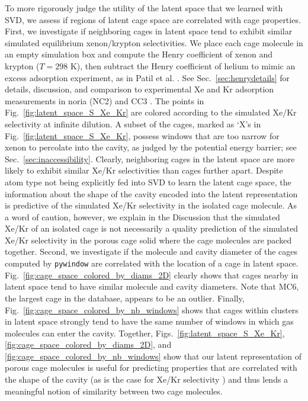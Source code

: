 \documentclass[journal=jacsat,manuscript=article,layout=traditional]{achemso}
\begin{document}
To more rigorously judge the utility of the latent space that we learned with SVD, we assess if regions of latent cage space are correlated with cage properties. First, we investigate if neighboring cages in latent space tend to exhibit similar simulated equilibrium xenon/krypton selectivities.
We place each cage molecule in an empty simulation box and compute the Henry coefficient of xenon and krypton ($T=298$ K), then subtract the Henry coefficient of helium to mimic an excess adsorption experiment, as in Patil et al. \cite{patil2016noria}. See Sec.~\ref{sec:henrydetails} for details, discussion, and comparison to experimental Xe and Kr adsorption measurements in noria (NC2) \cite{patil2016noria} and CC3 \cite{chen2014separation}.
The points in Fig.~\ref{fig:latent_space_S_Xe_Kr} are colored according to the simulated Xe/Kr selectivity at infinite dilution. {\color{red} A subset of the cages, marked as `X's in Fig.~\ref{fig:latent_space_S_Xe_Kr}, possess windows that are too narrow for xenon to percolate into the cavity, as judged by the potential energy barrier; see Sec.~\ref{sec:inaccessibility}.
} Clearly, neighboring cages in the latent space are more likely to exhibit similar Xe/Kr selectivities than cages further apart. Despite atom type not being explicitly fed into SVD to learn the latent cage space, the information about the shape of the cavity encoded into the latent representation is predictive of the simulated Xe/Kr selectivity {\color{red} in the isolated cage molecule. As a word of caution, however, we explain in the Discussion that the simulated Xe/Kr of an isolated cage is not necessarily a quality prediction of the simulated Xe/Kr selectivity in the porous cage solid where the cage molecules are packed together.}
Second, we investigate if the molecule and cavity diameter of the cages computed by \texttt{pywindow} \cite{miklitz2018pywindow} are correlated with the location of a cage in latent space. Fig.~\ref{fig:cage_space_colored_by_diams_2D} clearly shows that cages nearby in latent space tend to have similar molecule and cavity diameters. Note that MC6, the largest cage in the database, appears to be an outlier. 
Finally, Fig.~\ref{fig:cage_space_colored_by_nb_windows} shows that cages within clusters in latent space strongly tend to have the same number of windows in which gas molecules can enter the cavity.
Together, Figs.~\ref{fig:latent_space_S_Xe_Kr}, \ref{fig:cage_space_colored_by_diams_2D}, and \ref{fig:cage_space_colored_by_nb_windows} show that our latent representation of porous cage molecules is useful for predicting properties that are correlated with the shape of the cavity (as is the case for Xe/Kr selectivity \cite{sikora2012thermodynamic,simon2015best}) and thus lends a meaningful notion of similarity between two cage molecules.
\end{document}
